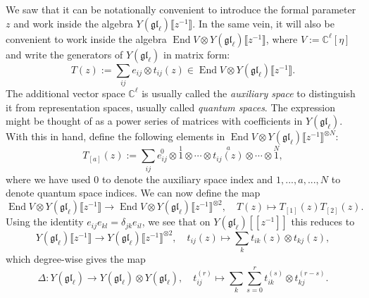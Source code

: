 \documentclass[11pt]{report}
\theoremstyle{definition}
\theoremstyle{remark}
\theoremstyle{remark}
\newcommand{\End}{\operatorname{End}}
\newcommand{\C}{\mathbb{C}}
\begin{document}
We saw that it can be notationally convenient to introduce the formal parameter $z$ and work inside the algebra $Y(\mathfrak{gl}_\ell)\llbracket z^{-1} \rrbracket$. In the same vein, it will also be convenient to work inside the algebra $\End V \otimes Y(\mathfrak{gl}_\ell)\llbracket z^{-1} \rrbracket$, where $V := \C^\ell[\eta]$ and write the generators of $Y(\mathfrak{gl}_\ell)$ in matrix form:
\begin{equation*}
T(z) := \sum_{ij} e_{ij} \otimes t_{ij}(z) \in \End V \otimes Y(\mathfrak{gl}_\ell)\llbracket z^{-1} \rrbracket.
\end{equation*}
The additional vector space $\C^\ell$ is usually called the \emph{auxiliary space} to distinguish it from representation spaces, usually called \emph{quantum spaces}. The expression might be thought of as a power series of matrices with coefficients in $Y(\mathfrak{gl}_\ell)$. With this in hand, define the following elements in $\End V \otimes Y(\mathfrak{gl}_\ell)\llbracket z^{-1} \rrbracket^{\otimes N}$:
\begin{equation*}
T_{[a]}(z) := \sum_{ij} \overset{0}{e_{ij}} \otimes \overset{1}{1} \otimes \cdots \otimes \overset{a}{t_{ij}(z)} \otimes \cdots \otimes \overset{N}{1},
\end{equation*}
where we have used $0$ to denote the auxiliary space index and $1,...,a,...,N$ to denote quantum space indices. We can now define the map
\begin{equation*}
\End V \otimes Y(\mathfrak{gl}_\ell)\llbracket z^{-1} \rrbracket \to \End V \otimes Y(\mathfrak{gl}_\ell)\llbracket z^{-1} \rrbracket^{\otimes 2}, \quad T(z) \mapsto T_{[1]}(z) T_{[2]}(z).
\end{equation*}
Using the identity $e_{ij} e_{kl} = \delta_{jk} e_{il}$, we see that on $Y(\mathfrak{gl}_\ell)[[z^{-1}]]$ this reduces to
\begin{equation*}
Y(\mathfrak{gl}_\ell)\llbracket z^{-1} \rrbracket \to Y(\mathfrak{gl}_\ell)\llbracket z^{-1} \rrbracket^{\otimes 2}, \quad t_{ij}(z) \mapsto \sum_k t_{ik}(z) \otimes t_{kj}(z),
\end{equation*}
which degree-wise gives the map
\begin{equation}\label{equation:coproduct}
\Delta: Y(\mathfrak{gl}_\ell) \to Y(\mathfrak{gl}_\ell) \otimes Y(\mathfrak{gl}_\ell), \quad t_{ij}^{(r)} \mapsto \sum_k \sum_{s=0}^r t_{ik}^{(s)} \otimes t_{kj}^{(r-s)}.
\end{equation}
\end{document}
